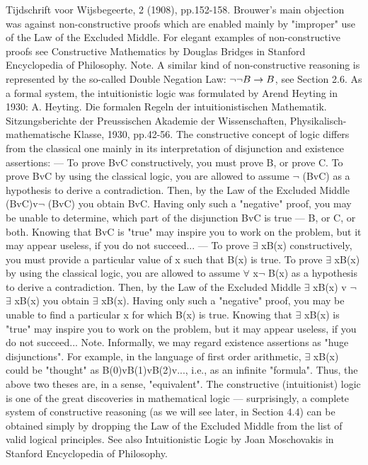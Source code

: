 Tijdschrift voor Wijsbegeerte, 2 (1908), pp.152-158.
Brouwer's main objection was against non-constructive proofs which are enabled mainly by "improper"
use of the Law of the Excluded Middle.
For elegant examples of non-constructive proofs see Constructive Mathematics by Douglas Bridges in
Stanford Encyclopedia of Philosophy.
Note. A similar kind of non-constructive reasoning is represented by the so-called Double Negation Law:
\(\neg \neg B\rightarrow B\), see Section 2.6.
As a formal system, the intuitionistic logic was formulated by Arend Heyting in 1930:
A. Heyting. Die formalen Regeln der intuitionistischen Mathematik. Sitzungsberichte der Preussischen Akademie der
Wissenschaften, Physikalisch-mathematische Klasse, 1930, pp.42-56.
The constructive concept of logic differs from the classical one mainly in its interpretation of disjunction
and existence assertions:
--- To prove BvC constructively, you must prove B, or prove C. To prove BvC by using the classical logic,
you are allowed to assume \(\neg\) (BvC) as a hypothesis to derive a contradiction. Then, by the Law of the
Excluded Middle (BvC)v\(\neg\) (BvC) you obtain BvC. Having only such a "negative" proof, you may be
unable to determine, which part of the disjunction BvC is true --- B, or C, or both. Knowing that BvC is
"true" may inspire you to work on the problem, but it may appear useless, if you do not succeed...
--- To prove \(\exists\) xB(x) constructively, you must provide a particular value of x such that B(x) is true. To
prove \(\exists\) xB(x) by using the classical logic, you are allowed to assume \(\forall\) x\(\neg\) B(x) as a hypothesis to derive a
contradiction. Then, by the Law of the Excluded Middle \(\exists\) xB(x) v \(\neg\) \(\exists\) xB(x) you obtain \(\exists\) xB(x). Having
only such a "negative" proof, you may be unable to find a particular x for which B(x) is true. Knowing
that \(\exists\) xB(x) is "true" may inspire you to work on the problem, but it may appear useless, if you do not
succeed...
Note. Informally, we may regard existence assertions as "huge disjunctions". For example, in the
language of first order arithmetic, \(\exists\) xB(x) could be "thought" as B(0)vB(1)vB(2)v..., i.e., as an infinite
"formula". Thus, the above two theses are, in a sense, "equivalent".
The constructive (intuitionist) logic is one of the great discoveries in mathematical logic --- surprisingly, a
complete system of constructive reasoning (as we will see later, in Section 4.4) can be obtained simply by
dropping the Law of the Excluded Middle from the list of valid logical principles.
See also Intuitionistic Logic by Joan Moschovakis in Stanford Encyclopedia of Philosophy.
